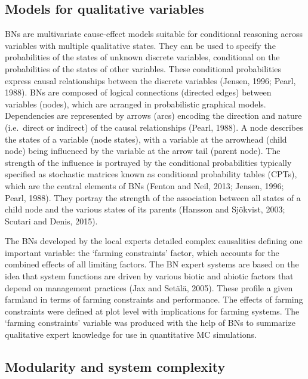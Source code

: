 \documentclass[]{elsarticle} %
\begin{document}
\hypertarget{ref33}{%
\subsection{Models for qualitative variables}\label{ref33}}

BNs are multivariate cause-effect models suitable for conditional reasoning across variables with multiple qualitative states. They can be used to specify the probabilities of the states of unknown discrete variables, conditional on the probabilities of the states of other variables. These conditional probabilities express causal relationships between the discrete variables (Jensen, 1996; Pearl, 1988). BNs are composed of logical connections (directed edges) between variables (nodes), which are arranged in probabilistic graphical models. Dependencies are represented by arrows (arcs) encoding the direction and nature (i.e.~direct or indirect) of the causal relationships (Pearl, 1988). A node describes the states of a variable (node states), with a variable at the arrowhead (child node) being influenced by the variable at the arrow tail (parent node). The strength of the influence is portrayed by the conditional probabilities typically specified as stochastic matrices known as conditional probability tables (CPTs), which are the central elements of BNs (Fenton and Neil, 2013; Jensen, 1996; Pearl, 1988). They portray the strength of the association between all states of a child node and the various states of its parents (Hansson and Sjökvist, 2003; Scutari and Denis, 2015).

The BNs developed by the local experts detailed complex causalities defining one important variable: the `farming constraints' factor, which accounts for the combined effects of all limiting factors. The BN expert systems are based on the idea that system functions are driven by various biotic and abiotic factors that depend on management practices (Jax and Setälä, 2005). These profile a given farmland in terms of farming constraints and performance. The effects of farming constraints were defined at plot level with implications for farming systems. The `farming constraints' variable was produced with the help of BNs to summarize qualitative expert knowledge for use in quantitative MC simulations.

\hypertarget{ref34}{%
\subsection{Modularity and system complexity}\label{ref34}}
\end{document}
